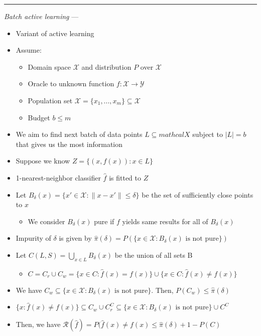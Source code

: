{\color{lightgray}\hrule height 0.001mm}

\emph{Batch active learning} ---
\begin{itemize}
    \item Variant of active learning
    \item Assume:
    \begin{itemize}
        \item Domain space $\mathcal{X}$ and distribution $P$ over $\mathcal{X}$
        \item Oracle to unknown function $f: \mathcal{X} \rightarrow \mathcal{Y}$
        \item Population set $\mathcal{X} = \{x_1, ..., x_m\} \subseteq \mathcal{X}$
        \item Budget $b \leq m$
    \end{itemize}
    \item We aim to find next batch of data points $L \subseteq mathcal{X}$ subject to $|L| = b$ that gives us the most information
    \item Suppose we know $Z = \{ (x,f(x)): x \in L \}$
    \item 1-nearest-neighbor classifier $\hat{f}$ is fitted to $Z$
    \item Let $B_\delta(x) = \{ x' \in \mathcal{X}: \| x - x' \| \leq \delta \}$ be the set of sufficiently close points to $x$
    \begin{itemize}
        \item We consider $B_\delta(x)$ pure if $f$ yields same results for all of $B_\delta(x)$
    \end{itemize}
    \item Impurity of $\delta$ is given by $\hat{\pi}(\delta) = P(\{{x \in \mathcal{X}: B_\delta(x) \textrm{ is not pure}}\})$
    \item Let  $C(L,S) = \bigcup_{x \in L} B_\delta(x)$ be the union of all sets B
    \begin{itemize}
        \item $C = C_r \cup C_w = \{x \in C: \hat{f}(x) = f(x)\} \cup \{x \in C: \hat{f}(x) \neq f(x)\}$
    \end{itemize}
    \item We have $C_w \subseteq \{{x \in \mathcal{X}: B_\delta(x) \textrm{ is not pure}}\}$. Then, $P(C_w) \leq \hat{\pi}(\delta)$
    \item $\{x: \hat{f}(x) \neq f(x)\} \subseteq C_w \cup C_r^C \subseteq \{{x \in \mathcal{X}: B_\delta(x) \textrm{ is not pure}}\} \cup C^C$
    \item Then, we have $\mathcal{R}(\hat{f}) = P(\hat{f}(x) \neq f(x) \leq \hat{\pi}(\delta) + 1-P(C)$

\end{itemize}
